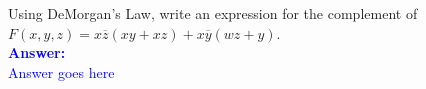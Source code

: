 \item{}
Using DeMorgan's Law, write an expression for the complement of\\[6pt]
$F(x,y,z)=x\overline{z}(xy+xz)+x\overline{y}(wz+y)$.\\[12pt]
\ifanswers
\textcolor{blue}{
\textbf{Answer:}\\
Answer goes here
}
\newpage
\fi

